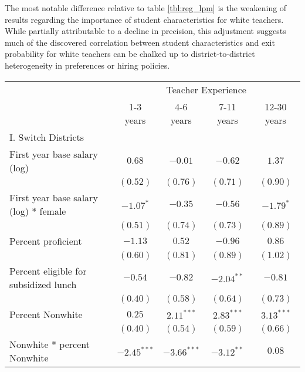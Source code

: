 \documentclass[12pt,]{article}
\begin{document}
The most notable difference relative to table \ref{tbl:reg_lpm} is the
weakening of results regarding the importance of student characteristics
for white teachers. While partially attributable to a decline in
precision, this adjustment suggests much of the discovered correlation
between student characteristics and exit probability for white teachers
can be chalked up to district-to-district heterogeneity in preferences
or hiring policies.

\begin{table}
\begin{center}
\begin{tabular}{l c c c c }
\hline
 & \multicolumn{4}{c}{Teacher Experience} \\ \cline{2-5}
 & 1-3 years & 4-6 years & 7-11 years & 12-30 years \\
\hline
I. Switch Districts                             &               &               &               &              \\
\quad First year base salary (log)           & $0.68$        & $-0.01$       & $-0.62$       & $1.37$       \\
                                                & $(0.52)$      & $(0.76)$      & $(0.71)$      & $(0.90)$     \\
\quad First year base salary (log) * female  & $-1.07^{*}$   & $-0.35$       & $-0.56$       & $-1.79^{*}$  \\
                                                & $(0.51)$      & $(0.74)$      & $(0.73)$      & $(0.89)$     \\
\quad Percent proficient                     & $-1.13$       & $0.52$        & $-0.96$       & $0.86$       \\
                                                & $(0.60)$      & $(0.81)$      & $(0.89)$      & $(1.02)$     \\
\quad Percent eligible for subsidized lunch  & $-0.54$       & $-0.82$       & $-2.04^{**}$  & $-0.81$      \\
                                                & $(0.40)$      & $(0.58)$      & $(0.64)$      & $(0.73)$     \\
\quad Percent Nonwhite                       & $0.25$        & $2.11^{***}$  & $2.83^{***}$  & $3.13^{***}$ \\
                                                & $(0.40)$      & $(0.54)$      & $(0.59)$      & $(0.66)$     \\
\quad Nonwhite * percent Nonwhite            & $-2.45^{***}$ & $-3.66^{***}$ & $-3.12^{**}$  & $0.08$       \\

\end{tabular}
\end{center}
\end{table}
\end{document}
